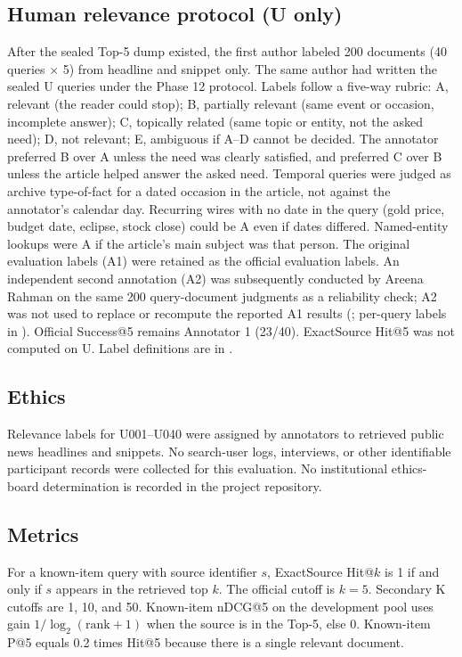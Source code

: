\documentclass[10pt,letterpaper]{article}
\begin{document}
\subsection*{Human relevance protocol (U only)}

After the sealed Top-5 dump existed, the first author labeled 200 documents (40 queries $\times$ 5) from headline and snippet only. The same author had written the sealed U queries under the Phase 12 protocol. Labels follow a five-way rubric: A, relevant (the reader could stop); B, partially relevant (same event or occasion, incomplete answer); C, topically related (same topic or entity, not the asked need); D, not relevant; E, ambiguous if A--D cannot be decided. The annotator preferred B over A unless the need was clearly satisfied, and preferred C over B unless the article helped answer the asked need. Temporal queries were judged as archive type-of-fact for a dated occasion in the article, not against the annotator's calendar day. Recurring wires with no date in the query (gold price, budget date, eclipse, stock close) could be A even if dates differed. Named-entity lookups were A if the article's main subject was that person. The original evaluation labels (A1) were retained as the official evaluation labels. An independent second annotation (A2) was subsequently conducted by Areena Rahman on the same 200 query-document judgments as a reliability check; A2 was not used to replace or recompute the reported A1 results (; per-query labels in ). Official Success@5 remains Annotator 1 (23/40). ExactSource Hit@5 was not computed on U. Label definitions are in .

\subsection*{Ethics}

Relevance labels for U001--U040 were assigned by annotators to retrieved public news headlines and snippets. No search-user logs, interviews, or other identifiable participant records were collected for this evaluation. No institutional ethics-board determination is recorded in the project repository.

\subsection*{Metrics}

For a known-item query with source identifier $s$, ExactSource Hit@$k$ is 1 if and only if $s$ appears in the retrieved top $k$. The official cutoff is $k = 5$. Secondary K cutoffs are 1, 10, and 50. Known-item nDCG@5 on the development pool uses gain $1/\log_2(\mathrm{rank}+1)$ when the source is in the Top-5, else 0. Known-item P@5 equals 0.2 times Hit@5 because there is a single relevant document.
\end{document}
